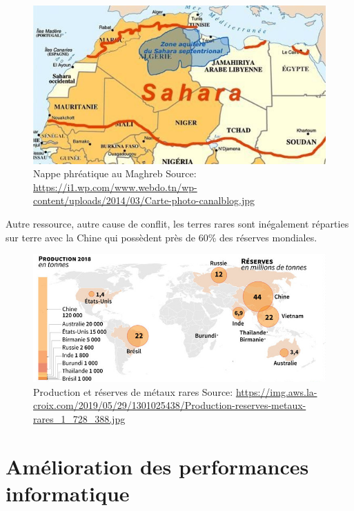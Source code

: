 \begin{figure}
  \centering
  \includegraphics[scale=0.35]{media/zone_aquifere_sahara.jpg}
  \caption{
    Nappe phréatique au Maghreb\newline
      \tiny{Source:\newline
        \url{https://i1.wp.com/www.webdo.tn/wp-content/uploads/2014/03/Carte-photo-canalblog.jpg}
      }
  }
  \label{fig:zone_aquifere_sahara}
\end{figure}

Autre ressource, autre cause de conflit, les terres rares sont inégalement réparties
sur terre avec la Chine qui possèdent près de 60\% des réserves mondiales.

\begin{figure}
  \centering
  \includegraphics[scale=0.5]{media/terres_rares.jpg}
  \caption{
    Production et réserves de métaux rares\newline
      \tiny{Source:\newline
        \url{https://img.aws.la-croix.com/2019/05/29/1301025438/Production-reserves-metaux-rares_1_728_388.jpg}
      }
  }
  \label{fig:terre_rare}
\end{figure}

\section{Amélioration des performances informatique}

